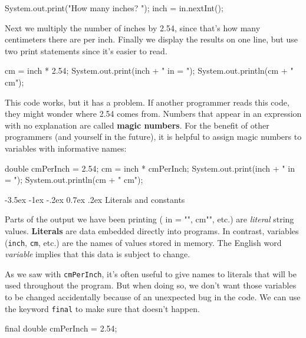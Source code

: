 \documentclass[12pt]{book}
\makeatletter
\theoremstyle{exercise}
\newcommand{\java}[1]{\verb"#1"}
\renewcommand{\section}{\@startsection{section}{1}{\z@}%
    {-3.5ex \@plus -1ex \@minus -.2ex}%
    {0.7ex \@plus.2ex}%
    {\normalfont\Large\bfseries}}
\newcommand{\java}[1]{\lstinline{#1}} %
\makeatother
\begin{document}
\begin{code}
    System.out.print("How many inches? ");
    inch = in.nextInt();
\end{code}

Next we multiply the number of inches by 2.54, since that's how many centimeters there are per inch.
Finally we display the results on one line, but use two print statements since it's easier to read.

\begin{code}
    cm = inch * 2.54;
    System.out.print(inch + " in = ");
    System.out.println(cm + " cm");
\end{code}


This code works, but it has a problem.
If another programmer reads this code, they might wonder where 2.54 comes from.
Numbers that appear in an expression with no explanation are called {\bf magic numbers}.
For the benefit of other programmers (and yourself in the future), it is helpful to assign magic numbers to variables with informative names:

\begin{code}
    double cmPerInch = 2.54;
    cm = inch * cmPerInch;
    System.out.print(inch + " in = ");
    System.out.println(cm + " cm");
\end{code}


\section{Literals and constants}


Parts of the output we have been printing (\java{" in = "}, \java{" cm"}, etc.) are {\em literal} string values.
{\bf Literals} are data embedded directly into programs.
In contrast, variables (\java{inch}, \java{cm}, etc.) are the names of values stored in memory.
The English word {\em variable} implies that this data is subject to change.


As we saw with \java{cmPerInch}, it's often useful to give names to literals that will be used throughout the program.
But when doing so, we don't want those variables to be changed accidentally because of an unexpected bug in the code.
We can use the keyword \java{final} to make sure that doesn't happen.

\begin{code}
    final double cmPerInch = 2.54;
\end{code}
\end{document}

